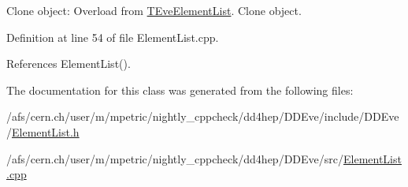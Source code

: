 Clone object: Overload from \hyperlink{class_t_eve_element_list}{TEveElementList}. Clone object. 

Definition at line 54 of file ElementList.cpp.

References ElementList().

The documentation for this class was generated from the following files:\begin{DoxyCompactItemize}
\item 
/afs/cern.ch/user/m/mpetric/nightly\_\-cppcheck/dd4hep/DDEve/include/DDEve/\hyperlink{_element_list_8h}{ElementList.h}\item 
/afs/cern.ch/user/m/mpetric/nightly\_\-cppcheck/dd4hep/DDEve/src/\hyperlink{_element_list_8cpp}{ElementList.cpp}\end{DoxyCompactItemize}
